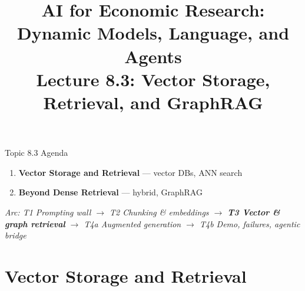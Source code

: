 


\usetikzlibrary{arrows.meta, positioning, shapes.geometric, fit, calc, backgrounds}

\providecommand{\OLG}{OLG}
\providecommand{\LLM}{\textsc{llm}}
\providecommand{\RAG}{\textsc{rag}}
\providecommand{\GraphRAG}{\textsc{GraphRAG}}

\graphicspath{{./pic/}{./figures/}{../../MiniCourse_8hr/Slides/Module4_Agentic_AI/pic/}{../}}

\title[AI for Econ Research]{AI for Economic Research: Dynamic Models, Language, and Agents\\
Lecture 8.3: Vector Storage, Retrieval, and GraphRAG}



\makebeamertitle

\begin{frame}{Topic 8.3 Agenda}
\begin{enumerate}
  \item \textbf{Vector Storage and Retrieval} --- vector DBs, ANN search
  \medskip
  \item \textbf{Beyond Dense Retrieval} --- hybrid, GraphRAG
\end{enumerate}

\medskip
\textit{Arc: T1 Prompting wall $\to$ T2 Chunking \& embeddings $\to$ \textbf{T3 Vector \& graph retrieval} $\to$ T4a Augmented generation $\to$ T4b Demo, failures, agentic bridge}
\end{frame}

\section{Vector Storage and Retrieval}

